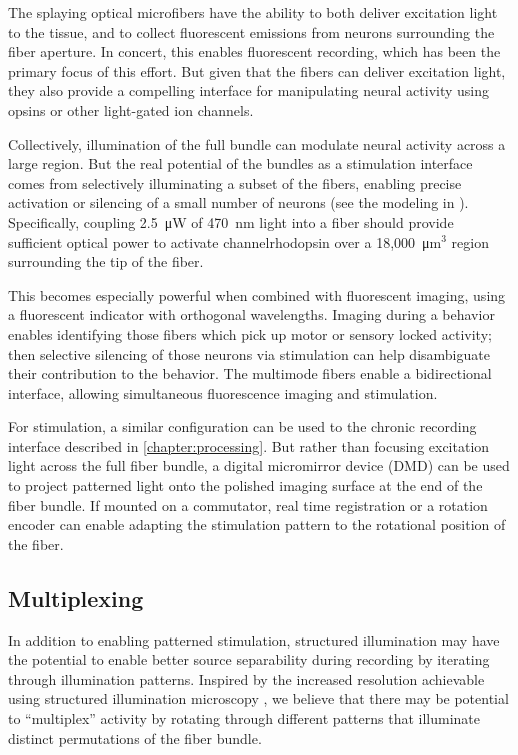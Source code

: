 The splaying optical microfibers have the ability to 
both deliver excitation light to the tissue, and to 
collect fluorescent emissions from neurons 
surrounding the fiber aperture. In concert, this 
enables fluorescent recording, which has been the 
primary focus of this effort. But given that the 
fibers can deliver excitation light, they also 
provide a compelling interface for manipulating 
neural activity using opsins or other light-gated 
ion channels. 

Collectively, illumination of the full bundle can 
modulate neural activity across a large region. But 
the real potential of the bundles as a stimulation 
interface comes from selectively illuminating a 
subset of the fibers, enabling precise activation 
or silencing of a small number of neurons (see 
the modeling in ). 
Specifically, coupling 2.5~\si{\micro\watt} of 
470~nm light into a fiber should provide sufficient 
optical power to activate channelrhodopsin over a 
18,000~\si{\micro\meter}$^3$ region surrounding 
the tip of the fiber.

This becomes especially powerful when combined 
with fluorescent imaging, using a fluorescent 
indicator with orthogonal wavelengths. Imaging 
during a behavior enables identifying those 
fibers which pick up motor or sensory locked 
activity; then selective silencing of those 
neurons via stimulation can help disambiguate 
their contribution to the behavior. The 
multimode fibers enable a bidirectional 
interface, allowing simultaneous fluorescence 
imaging and stimulation.

For stimulation, a similar configuration can be 
used to the chronic recording interface described 
in \cref{chapter:processing}. But rather than 
focusing excitation light across the full fiber  
bundle, a digital micromirror device (DMD) can be 
used to project patterned light onto the polished 
imaging surface at the end of the fiber bundle. 
If mounted on a commutator, real time registration 
or a rotation encoder can enable adapting the 
stimulation pattern to the rotational position of 
the fiber.

\subsection{Multiplexing}

In addition to enabling patterned stimulation, 
structured illumination may have the potential 
to enable better source separability during 
recording by iterating through illumination 
patterns. Inspired by the increased resolution 
achievable using structured illumination 
microscopy
\cite{Gustafsson:2000wj,Gustafsson:2005hg,Saxena:2015fm},
we believe that there may be potential 
to ``multiplex'' activity by rotating through 
different patterns that illuminate distinct 
permutations of the fiber bundle. 

